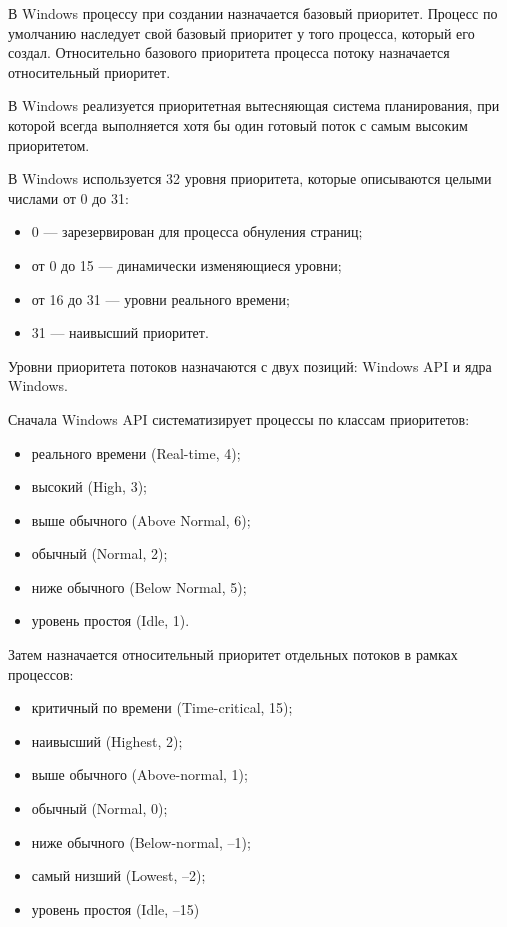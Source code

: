 В Windows процессу при создании назначается базовый приоритет.
Процесс по умолчанию наследует свой базовый приоритет у того процесса, который его создал.
Относительно базового приоритета процесса потоку назначается относительный приоритет.

В Windows реализуется приоритетная вытесняющая система планирования, при которой всегда выполняется хотя бы один готовый поток с самым высоким приоритетом.

В Windows используется 32 уровня приоритета, которые описываются целыми числами от 0 до 31:
\begin{itemize}
	\item 0 --- зарезервирован для процесса обнуления страниц;
	\item от 0 до 15 --- динамически изменяющиеся уровни;
	\item от 16 до 31 --- уровни реального времени;
	\item 31 --- наивысший приоритет.
\end{itemize}

Уровни приоритета потоков назначаются с двух позиций: Windows API и ядра Windows.

Сначала Windows API систематизирует процессы по классам приоритетов:
\begin{itemize}
	\item реального времени (Real-time, 4);
	\item высокий (High, 3);
	\item выше обычного (Above Normal, 6);
	\item обычный (Normal, 2);
	\item ниже обычного (Below Normal, 5);
	\item уровень простоя (Idle, 1).
\end{itemize}

Затем назначается относительный приоритет отдельных потоков в рамках процессов:
\begin{itemize}
	\item критичный по времени (Time-critical, 15);
	\item наивысший (Highest, 2);
	\item выше обычного (Above-normal, 1);
	\item обычный (Normal, 0);
	\item ниже обычного (Below-normal, –1);
	\item самый низший (Lowest, –2);
	\item уровень простоя (Idle, –15)
\end{itemize}

